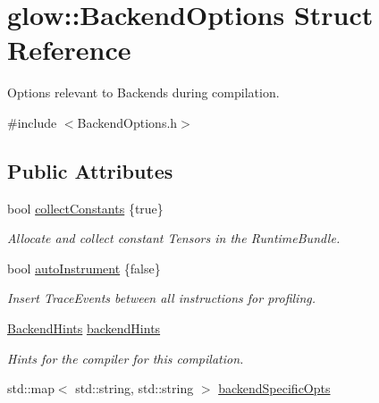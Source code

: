\hypertarget{structglow_1_1_backend_options}{}\section{glow\+:\+:Backend\+Options Struct Reference}
\label{structglow_1_1_backend_options}


Options relevant to Backends during compilation.  




{\ttfamily \#include $<$Backend\+Options.\+h$>$}

\subsection*{Public Attributes}
\begin{DoxyCompactItemize}
\item 
\mbox{\label{structglow_1_1_backend_options_a3fff606445133b2d30b9ba8963bf7107}} 
bool \hyperlink{structglow_1_1_backend_options_a3fff606445133b2d30b9ba8963bf7107}{collect\+Constants} \{true\}
\begin{DoxyCompactList}\small\item\em Allocate and collect constant Tensors in the Runtime\+Bundle. \end{DoxyCompactList}\item 
\mbox{\label{structglow_1_1_backend_options_ab0964700f34d1fbaff606c42583a6f4f}} 
bool \hyperlink{structglow_1_1_backend_options_ab0964700f34d1fbaff606c42583a6f4f}{auto\+Instrument} \{false\}
\begin{DoxyCompactList}\small\item\em Insert Trace\+Events between all instructions for profiling. \end{DoxyCompactList}\item 
\mbox{\label{structglow_1_1_backend_options_a8202550f206d059071376fbc215ada85}} 
\hyperlink{structglow_1_1_backend_hints}{Backend\+Hints} \hyperlink{structglow_1_1_backend_options_a8202550f206d059071376fbc215ada85}{backend\+Hints}
\begin{DoxyCompactList}\small\item\em Hints for the compiler for this compilation. \end{DoxyCompactList}\item 
std\+::map$<$ std\+::string, std\+::string $>$ \hyperlink{structglow_1_1_backend_options_a512200407cdc1933ea8ceafd005e3ff4}{backend\+Specific\+Opts}
\end{DoxyCompactItemize}


